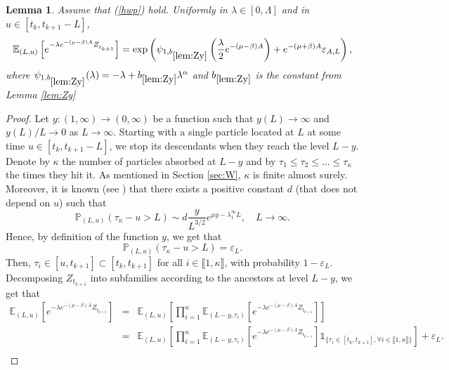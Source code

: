 \documentclass[11pt]{article}
\theoremstyle{plain}
\newtheorem{lemma}{Lemma}[section]
\newcommand\linf{\lambda_1^\infty}
\newcommand\vep{\varepsilon}
\begin{document}
\begin{lemma}\label{lemma72}
Assume that (\ref{hwp}) hold. Uniformly in $\lambda\in[0,\Lambda]$ and in $u\in[t_k,t_{k+1}-L]$,
\begin{equation*}
\mathbb{E}_{(L,u)}\left[e^{-\lambda e^{-(\mu-\beta) A} Z^{}_{t_{k+1}}}\right]=\exp\left(\psi_{1,b_{\ref{lem:Zy}}}\left(\frac{\lambda}{2}e^{-(\mu-\beta) A}\right)+e^{-(\mu+\beta) A}\vep_{A,L}\right),
\end{equation*}
where $\psi_{1,b_{\ref{lem:Zy}}}(\lambda)=-\lambda+b_{\ref{lem:Zy}}\lambda^\alpha$ and $b_{\ref{lem:Zy}}$ is the constant from Lemma \ref{lem:Zy}
\end{lemma}
\begin{proof} Let $y:(1,\infty)\rightarrow (0,\infty)$ be a function such that $y(L)\rightarrow\infty$ and $y(L)/L\to0$ as $L\to \infty$. Starting with a single particle located at $L$ at some time $u\in[t_k,t_{k+1}-L]$, we stop its descendants when they reach the level $L-y$. Denote by $\kappa$ the number of particles absorbed at $L-y$ and by $\tau_1\leq\tau_2\leq...\leq\tau_\kappa$ the times they hit it. As mentioned in Section \ref{sec:W}, $\kappa$ is finite almost surely. Moreover, it is known (see \cite[Theorem 1]{Harris:2007aa}) that there exists a positive constant $d$ (that does not depend on $u$) such that
\begin{equation*}
\mathbb{P}_{(L,u)}(\tau_\kappa-u>L)\sim d\frac{y}{L^{3/2}}e^{\mu y- \linf L}, \quad L\to\infty.
\end{equation*}
Hence, by definition of the function $y$, we get that
\begin{equation*}
\mathbb{P}_{(L,u)}(\tau_\kappa-u>L)=\vep_L.
\end{equation*}
Then,  $\tau_i\in[u,t_{k+1}]\subset[t_k,t_{k+1}]$ for all $i\in\llbracket 1,\kappa\rrbracket$, with probability $1-\vep_L$.
Decomposing $Z_{t_{k+1}}$ into subfamilies according to the ancestors at level $L-y$, we get that
\begin{eqnarray*}
\mathbb{E}_{(L,u)}\left[e^{-\lambda e^{-(\mu-\beta)A} Z^{}_{t_{k+1}}}\right]&=&\mathbb{E}_{(L,u)}\left[\prod_{i=1}^\kappa \mathbb{E}_{(L-y,\tau_i)}\left[e^{-\lambda e^{-(\mu-\beta)A} Z^{}_{t_{k+1}}}\right]\right]\\
&=&\mathbb{E}_{(L,u)}\left[\prod_{i=1}^\kappa \mathbb{E}_{(L-y,\tau_i)}\left[e^{-\lambda e^{-(\mu-\beta)A} Z^{}_{t_{k+1}}}\right]\mathbb{1}_{\{\tau_i\in[t_k,t_{k+1}], \forall i\in\llbracket 1,\kappa\rrbracket\}}\right]+\vep_L.\\

\end{eqnarray*}
\end{proof}
\end{document}
